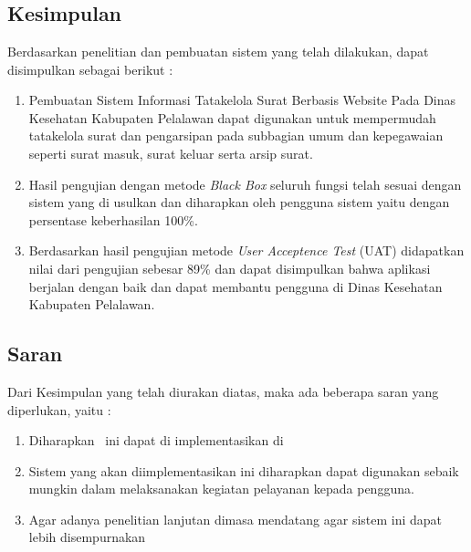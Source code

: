 %
%
%
%


\chapter{\babEnam}
\section{Kesimpulan}
Berdasarkan penelitian dan pembuatan sistem yang telah dilakukan, dapat disimpulkan sebagai berikut :

\begin{enumerate}
	\item Pembuatan Sistem Informasi Tatakelola Surat Berbasis Website Pada Dinas Kesehatan Kabupaten Pelalawan dapat digunakan untuk mempermudah tatakelola surat dan pengarsipan pada subbagian umum dan kepegawaian seperti surat masuk, surat keluar serta arsip surat.

	\item Hasil pengujian dengan metode \textit{Black Box} seluruh fungsi telah sesuai dengan sistem yang di usulkan dan diharapkan oleh pengguna sistem yaitu dengan persentase keberhasilan 100\%.

	\item Berdasarkan hasil pengujian metode \textit{User Acceptence Test} (UAT) didapatkan nilai dari pengujian sebesar 89\% dan dapat disimpulkan bahwa aplikasi berjalan dengan baik dan dapat membantu pengguna di Dinas Kesehatan Kabupaten Pelalawan.
	
\end{enumerate}
\section{Saran}
	Dari Kesimpulan yang telah diurakan diatas, maka ada beberapa saran yang
diperlukan, yaitu :
\begin{enumerate}
	
	\item Diharapkan \namasistem \ ini dapat di implementasikan di \namatempat
	\item Sistem yang akan diimplementasikan ini diharapkan dapat digunakan
	sebaik mungkin dalam melaksanakan kegiatan pelayanan kepada pengguna.
	\item Agar adanya penelitian lanjutan dimasa mendatang agar sistem ini dapat
	lebih disempurnakan
\end{enumerate}

